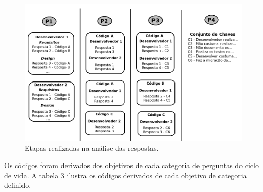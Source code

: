 \begin{figure}[h]
\hspace*{-1.5cm}
	\label{fig02}
		\includegraphics[scale=0.7]{figuras/Esquematico_Analise_2}
	\caption{Etapas realizadas na análise das respostas.}
\end{figure}

Os códigos foram derivados dos objetivos de cada categoria de perguntas do ciclo de vida. A tabela 3 ilustra os códigos derivados de cada objetivo de categoria definido.

